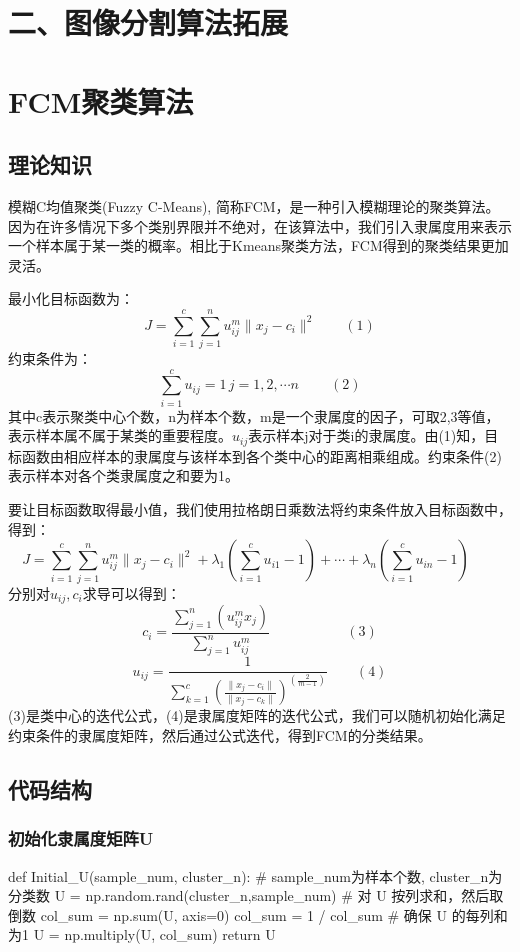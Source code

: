 \documentclass{article}
\begin{document}
\section*{二、图像分割算法拓展}	
\section{FCM聚类算法}
\subsection{理论知识}
模糊C均值聚类(Fuzzy C-Means), 简称FCM，是一种引入模糊理论的聚类算法。因为在许多情况下多个类别界限并不绝对，在该算法中，我们引入隶属度用来表示一个样本属于某一类的概率。相比于Kmeans聚类方法，FCM得到的聚类结果更加灵活。

最小化目标函数为：
$$ J=\sum_{i=1}^c \sum_{j=1}^nu_{ij}^m\|x_j-c_i\|^2\qquad(1)$$
约束条件为：
$$\sum_{i=1}^{c}u_{ij}=1\, j=1,2,\cdots n\ \qquad(2)$$
其中c表示聚类中心个数，n为样本个数，m是一个隶属度的因子，可取2,3等值，表示样本属不属于某类的重要程度。$u_{ij}$表示样本j对于类i的隶属度。由(1)知，目标函数由相应样本的隶属度与该样本到各个类中心的距离相乘组成。约束条件(2)表示样本对各个类隶属度之和要为1。

要让目标函数取得最小值，我们使用拉格朗日乘数法将约束条件放入目标函数中，得到：
$$J=\sum_{i=1}^c \sum_{j=1}^nu_{ij}^m\|x_j-c_i\|^2+\lambda_1(\sum_{i=1}^{c}u_{i1}-1)+\cdots+\lambda_n(\sum_{i=1}^{c}u_{in}-1)\qquad$$
分别对$u_{ij},c_i$求导可以得到：
$$c_i=\frac{\sum_{j=1}^n(u_{ij}^mx_j)}{\sum_{j=1}^nu_{ij}^m}\ \ \quad\qquad\qquad(3)$$
$$u_{ij}=\frac{1}{\sum_{k=1}^{c}(\frac{\|x_j-c_i\|}{\|x_j-c_k\|})^{(\frac{2}{m-1})}}\qquad(4)$$
(3)是类中心的迭代公式，(4)是隶属度矩阵的迭代公式，我们可以随机初始化满足约束条件的隶属度矩阵，然后通过公式迭代，得到FCM的分类结果。

\subsection{代码结构}
\subsubsection{初始化隶属度矩阵U}
\begin{python}
	def Initial_U(sample_num, cluster_n):
		 # sample_num为样本个数, cluster_n为分类数
		 U = np.random.rand(cluster_n,sample_num)
		 # 对 U 按列求和，然后取倒数
		 col_sum = np.sum(U, axis=0)
		 col_sum = 1 / col_sum
		 # 确保 U 的每列和为1
		 U = np.multiply(U, col_sum)
		 return U
\end{python}	
\end{document}
